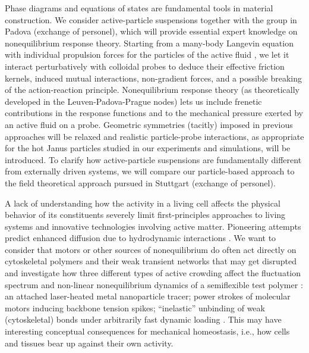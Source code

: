 \begin{workpackage}[id=WPactive,wphases=0-48,
  short=Active Particle Suspensions,%
  title=Probing active particle suspensions with colloids and polymers,
  lead=ULEI,
  ULEIRM=96,UNIPDRM=6,USTUTTRM=2]
\begin{tasklist}

\begin{task}[title=Nonequilibrium equations of state (NEOS),id=task1,PM=8,lead=ULEI,partners={UNIPD,USTUTT},
wphases=0-48!0.5]
Phase diagrams and equations of states are fundamental tools in material construction.
We consider active-particle suspensions together with the group in Padova (exchange of personel), 
which will provide essential expert knowledge on nonequilibrium response theory.
%
Starting from a many-body Langevin equation with individual propulsion forces for the
particles of the active fluid \cite{solon-etal:2015}, we let it interact perturbatively with colloidal probes to
deduce their effective friction kernels, induced mutual interactions, non-gradient forces, and a possible breaking of
the action-reaction principle.  
%
Nonequilibrium response theory (as theoretically developed in the Leuven-Padova-Prague nodes) lets us include 
frenetic contributions in the response functions \cite{baiesi-wynants:2009} and to the mechanical pressure 
exerted by an active fluid on a probe. 
%
Geometric symmetries (tacitly) imposed in previous approaches will be relaxed and realistic particle-probe interactions, 
as appropriate for the hot Janus particles studied in our experiments and simulations, will be introduced.
%
To clarify how active-particle suspensions are fundamentally different from externally driven systems,
we will compare our particle-based approach to the field theoretical approach pursued in Stuttgart (exchange of personel). 

\end{task}

\begin{task}[title=Active Crowding,id=task2,lead=ULEI,partners={KUL},wphases=0-48!0.5]
A lack of understanding how the activity in a living cell affects the physical behavior
of its constituents severely limit first-principles approaches to living systems and 
innovative technologies involving active matter.
Pioneering attempts predict enhanced diffusion due to hydrodynamic interactions \cite{mikhailov-kapral:2015}.
%
We want to consider that motors or other sources of nonequilibrium do often act directly on cytoskeletal 
polymers and their weak transient networks that may get disrupted and investigate how three different types of active
crowding affect the fluctuation spectrum and non-linear nonequilibrium dynamics of a 
semiflexible test polymer \cite{otto-etal:2013}:
an attached laser-heated metal nanoparticle tracer; power strokes of molecular
motors inducing backbone tension spikes; ``inelastic''  \cite{gralka-kroy:2015}
unbinding of weak (cytoskeletal) bonds under arbitrarily fast dynamic loading \cite{bullerjahn-sturm-kroy:2014}.
%
This may have interesting conceptual consequences for mechanical homeostasis, i.e., how cells and tissues bear up against 
their own activity.   


\end{task}
\end{tasklist}
\end{workpackage}

